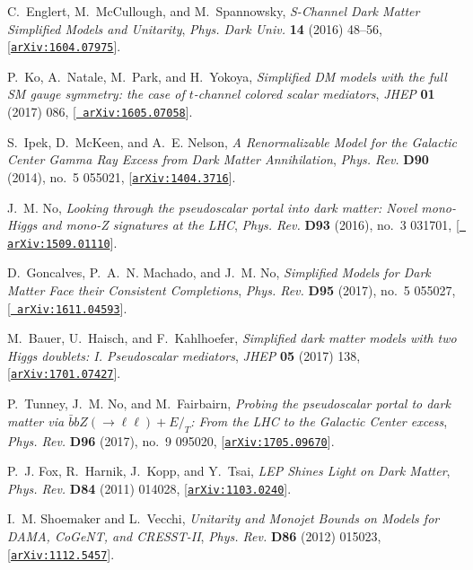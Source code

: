 \documentclass[review]{elsarticle}
\begin{document}
\begin{thebibliography}{100}
C.~Englert, M.~McCullough, and M.~Spannowsky, {\it {S-Channel Dark Matter
  Simplified Models and Unitarity}},  {\em Phys. Dark Univ.} {\bf 14} (2016)
  48--56, [\href{http://arxiv.org/abs/1604.07975}{{\tt arXiv:1604.07975}}].

P.~Ko, A.~Natale, M.~Park, and H.~Yokoya, {\it {Simplified DM models with the
  full SM gauge symmetry: the case of $t$-channel colored scalar mediators}},
  {\em JHEP} {\bf 01} (2017) 086, [\href{http://arxiv.org/abs/1605.07058}{{\tt
  arXiv:1605.07058}}].

S.~Ipek, D.~McKeen, and A.~E. Nelson, {\it {A Renormalizable Model for the
  Galactic Center Gamma Ray Excess from Dark Matter Annihilation}},  {\em Phys.
  Rev.} {\bf D90} (2014), no.~5 055021,
  [\href{http://arxiv.org/abs/1404.3716}{{\tt arXiv:1404.3716}}].

J.~M. No, {\it {Looking through the pseudoscalar portal into dark matter: Novel
  mono-Higgs and mono-Z signatures at the LHC}},  {\em Phys. Rev.} {\bf D93}
  (2016), no.~3 031701, [\href{http://arxiv.org/abs/1509.01110}{{\tt
  arXiv:1509.01110}}].

D.~Goncalves, P.~A.~N. Machado, and J.~M. No, {\it {Simplified Models for Dark
  Matter Face their Consistent Completions}},  {\em Phys. Rev.} {\bf D95}
  (2017), no.~5 055027, [\href{http://arxiv.org/abs/1611.04593}{{\tt
  arXiv:1611.04593}}].

M.~Bauer, U.~Haisch, and F.~Kahlhoefer, {\it {Simplified dark matter models
  with two Higgs doublets: I. Pseudoscalar mediators}},  {\em JHEP} {\bf 05}
  (2017) 138, [\href{http://arxiv.org/abs/1701.07427}{{\tt arXiv:1701.07427}}].

P.~Tunney, J.~M. No, and M.~Fairbairn, {\it {Probing the pseudoscalar portal to
  dark matter via $\bar bbZ(\to\ell\ell)+ E\!\!\!/_T$: From the LHC to the
  Galactic Center excess}},  {\em Phys. Rev.} {\bf D96} (2017), no.~9 095020,
  [\href{http://arxiv.org/abs/1705.09670}{{\tt arXiv:1705.09670}}].

P.~J. Fox, R.~Harnik, J.~Kopp, and Y.~Tsai, {\it {LEP Shines Light on Dark
  Matter}},  {\em Phys. Rev.}  {\bf D84} (2011) 014028,
  [\href{http://arxiv.org/abs/1103.0240}{{\tt arXiv:1103.0240}}].

I.~M. Shoemaker and L.~Vecchi, {\it {Unitarity and Monojet Bounds on Models for
  DAMA, CoGeNT, and CRESST-II}},  {\em Phys. Rev.} {\bf D86} (2012) 015023,
  [\href{http://arxiv.org/abs/1112.5457}{{\tt arXiv:1112.5457}}].


\end{thebibliography}
\end{document}
